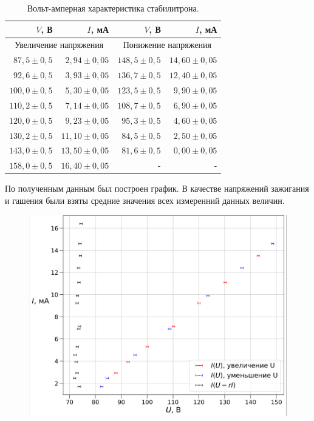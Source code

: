 \documentclass[14pt,a4paper]{article}
\begin{document}
\begin{table}[H]
	\centering
    \begin{tabular}{|r|r||r|r|}
	\hline $V$, В & $I$, мА & $V$, В & $I$, мА \\ \hline
	\multicolumn{2}{|c||}{Увеличение напряжения} & \multicolumn{2}{|c|}{Понижение напряжения} \\ \hline
$87,5 \pm 0,5$ & $2,94 \pm 0,05$ & $148,5 \pm 0,5$ & $14,60 \pm 0,05$ \\ \hline
$92,6 \pm 0,5$ & $3,93 \pm 0,05$ & $136,7 \pm 0,5$ & $12,40 \pm 0,05$  \\ \hline
$100,0 \pm 0,5$ & $5,30 \pm 0,05$ & $123,5 \pm 0,5$ & $9,90 \pm 0,05$ \\ \hline
$110,2 \pm 0,5$ & $7,14 \pm 0,05$ & $108,7 \pm 0,5$ & $6,90 \pm 0,05$  \\ \hline
$120,0 \pm 0,5$ & $9,23 \pm 0,05$ & $95,3 \pm 0,5$  & $4,60 \pm 0,05$  \\ \hline
$130,2 \pm 0,5$ & $11,10 \pm 0,05$ & $84,5 \pm 0,5$  & $2,50 \pm 0,05$  \\ \hline
$143,0 \pm 0,5$ & $13,50 \pm 0,05$ & $81,6 \pm 0,5$ & $0,00 \pm 0,05$  \\ \hline
$158,0 \pm 0,5$ & $16,40 \pm 0,05$ & - & - \\ \hline 
    \end{tabular}
    \caption{Вольт-амперная характеристика стабилитрона.}
    \label{voltamp}
\end{table}

По полученным данным был построен график. В качестве напряжений зажигания и гашения были взяты средние значения всех измеренний данных величин.

\begin{figure}[H]
    \centering
    \includegraphics[scale=0.45]{I(U).png}
\end{figure}
\end{document}

